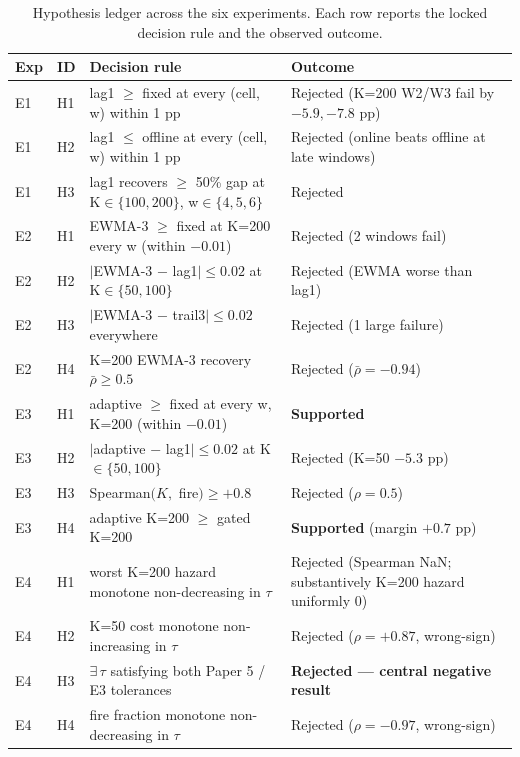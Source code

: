 \begin{table}[!t]
  \caption{Hypothesis ledger across the six experiments. Each
  row reports the locked decision rule and the observed outcome.}
  \label{tab:hypothesis_ledger}
  \centering
  \small
  \setlength{\tabcolsep}{4pt}
  \setlength{\tabcolsep}{4pt}
  \begin{tabular}{@{}llp{7.2cm}p{4.2cm}@{}}
    \toprule
    \textbf{Exp} & \textbf{ID} & \textbf{Decision rule} & \textbf{Outcome} \\
    \midrule
    E1 & H1 & lag1 $\geq$ fixed at every (cell, w) within 1 pp & Rejected (K=200 W2/W3 fail by $-5.9, -7.8$ pp) \\
    E1 & H2 & lag1 $\leq$ offline at every (cell, w) within 1 pp & Rejected (online beats offline at late windows) \\
    E1 & H3 & lag1 recovers $\geq$ 50\% gap at K$\in\{100,200\}$, w$\in\{4,5,6\}$ & Rejected \\
    \midrule
    E2 & H1 & EWMA-3 $\geq$ fixed at K=200 every w (within $-0.01$) & Rejected (2 windows fail) \\
    E2 & H2 & $|$EWMA-3 $-$ lag1$|\leq 0.02$ at K$\in\{50,100\}$ & Rejected (EWMA worse than lag1) \\
    E2 & H3 & $|$EWMA-3 $-$ trail3$|\leq 0.02$ everywhere & Rejected (1 large failure) \\
    E2 & H4 & K=200 EWMA-3 recovery $\bar\rho \geq 0.5$ & Rejected ($\bar\rho = -0.94$) \\
    \midrule
    E3 & H1 & adaptive $\geq$ fixed at every w, K=200 (within $-0.01$) & \textbf{Supported} \\
    E3 & H2 & $|$adaptive $-$ lag1$|\leq 0.02$ at K$\in\{50,100\}$ & Rejected (K=50 $-5.3$ pp) \\
    E3 & H3 & Spearman$(K, $ fire$) \geq +0.8$ & Rejected ($\rho = 0.5$) \\
    E3 & H4 & adaptive K=200 $\geq$ gated K=200 & \textbf{Supported} (margin $+0.7$ pp) \\
    \midrule
    E4 & H1 & worst K=200 hazard monotone non-decreasing in $\tau$ & Rejected (Spearman NaN; substantively K=200 hazard uniformly 0) \\
    E4 & H2 & K=50 cost monotone non-increasing in $\tau$ & Rejected ($\rho = +0.87$, wrong-sign) \\
    E4 & H3 & $\exists\,\tau$ satisfying both Paper 5 / E3 tolerances & \textbf{Rejected --- central negative result} \\
    E4 & H4 & fire fraction monotone non-decreasing in $\tau$ & Rejected ($\rho = -0.97$, wrong-sign) \\

\end{tabular}
\end{table}
